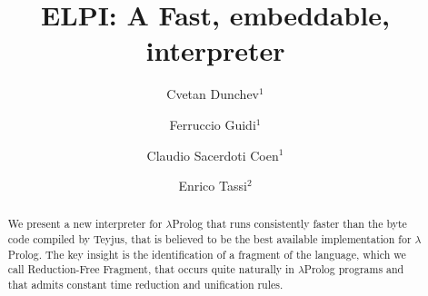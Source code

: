 \documentclass{llncs}
\begin{document}
\title{ELPI: A Fast, embeddable, \lp{} interpreter}





\author{Cvetan Dunchev$^1$ \and
        Ferruccio Guidi$^1$ \and
        Claudio Sacerdoti Coen$^1$ \and
        Enrico Tassi$^2$}






\newcommand{\frag}{Reduction-Free Fragment}
\newcommand{\lp}{$\lambda$Prolog}
\newcommand{\Ll}{\ensuremath{\mathcal{L}_\lambda}}
\newcommand{\elpi}{ELPI}
\newcommand{\tedius}{Teyjus}
\newcommand{\CSC}[1]{\textcolor{red}{#1}}
\newcommand{\FG}[1]{\textcolor{magenta}{#1}}

\maketitle

\begin{abstract}
We present a new interpreter for \lp{} that runs consistently faster than
the byte code compiled by \tedius{}, that is believed to be the best
available implementation for \lp. 
The key insight is the identification of a fragment of
the language, which we call \frag{}, that occurs quite naturally in \lp{}
programs and that admits constant time reduction and unification rules.
\end{abstract}
\end{document}
